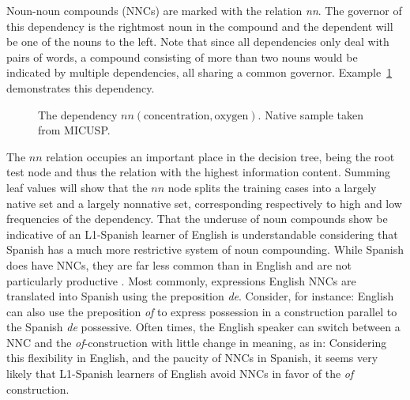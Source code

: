 \documentclass[main.tex]{subfiles}
\begin{document}
Noun-noun compounds (NNCs) are marked with the relation \textit{nn}. The governor of this dependency is the rightmost noun in the compound and the dependent will be one of the nouns to the left. Note that since all dependencies only deal with pairs of words, a compound consisting of more than two nouns would be indicated by multiple dependencies, all sharing a common governor. Example~\ref{fig:nn-deps} demonstrates this dependency. 

\begin{figure}[htbp]
\caption{The dependency $nn(\text{concentration}, \text{oxygen})$. Native sample taken from MICUSP.}
\centering
{}
\label{fig:nn-deps}
\end{figure}

The $nn$ relation occupies an important place in the decision tree, being the root test node and thus the relation with the highest information content. Summing leaf values will show that the $nn$ node splits the training cases into a largely native set and a largely nonnative set, corresponding respectively to high and low frequencies of the dependency. That the underuse of noun compounds show be indicative of an L1-Spanish learner of English is understandable considering that Spanish has a much more restrictive system of noun compounding. While Spanish does have NNCs, they are far less common than in English and are not particularly productive \citep{piera:1995}. Most commonly, expressions English NNCs are translated into Spanish using the preposition \textit{de}. Consider, for instance:
English can also use the preposition \textit{of} to express possession in a construction parallel to the Spanish \textit{de} possessive. Often times, the English speaker can switch between a NNC and the \textit{of}-construction with little change in meaning, as in:
Considering this flexibility in English, and the paucity of NNCs in Spanish, it seems very likely that L1-Spanish learners of English avoid NNCs in favor of the \textit{of} construction.
\end{document}
